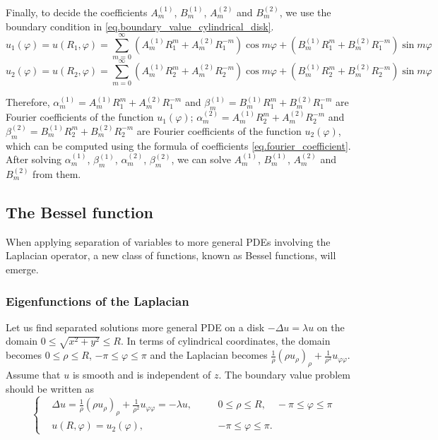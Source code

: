 Finally, to decide the coefficients $A^{(1)}_m$, $B^{(1)}_m$, $A^{(2)}_m$ and $B^{(2)}_m$, we use the boundary condition in \eqref{eq.boundary_value_cylindrical_disk}.
$$
u_1(\varphi) = u(R_1, \varphi)=\sum_{m = 0}^\infty\left(A^{(1)}_mR_1^m + A^{(2)}_mR_1^{-m}\right)\cos m \varphi + \left(B^{(1)}_mR_1^m + B^{(2)}_mR_1^{-m}\right)\sin m \varphi
$$
$$
u_2(\varphi) = u(R_2, \varphi)=\sum_{m = 0}^\infty\left(A^{(1)}_mR_2^m + A^{(2)}_mR_2^{-m}\right)\cos m \varphi + \left(B^{(1)}_mR_2^m + B^{(2)}_mR_2^{-m}\right)\sin m \varphi
$$

Therefore, $\alpha^{(1)}_m = A^{(1)}_mR_1^m + A^{(2)}_mR_1^{-m}$ and $\beta^{(1)}_m = B^{(1)}_mR_1^m + B^{(2)}_mR_1^{-m}$ are Fourier coefficients of the function $u_1(\varphi)$; $\alpha^{(2)}_m = A^{(1)}_mR_2^m + A^{(2)}_mR_2^{-m}$ and $\beta^{(2)}_m = B^{(1)}_mR_2^m + B^{(2)}_mR_2^{-m}$ are Fourier coefficients of the function $u_2(\varphi)$, which can be computed using the formula of coefficients \eqref{eq.fourier_coefficient}. After solving $\alpha^{(1)}_m$, $\beta^{(1)}_m$, $\alpha^{(2)}_m$, $\beta^{(2)}_m$, we can solve $A^{(1)}_m$, $B^{(1)}_m$, $A^{(2)}_m$ and $B^{(2)}_m$ from them.

\subsection{The Bessel function}

When applying separation of variables to more general PDEs involving the Laplacian operator, a new class of functions, known as Bessel functions, will emerge.

\subsubsection{Eigenfunctions of the Laplacian}
Let us find separated solutions more general PDE on a disk $-\Delta u = \lambda u$ on the domain $0 \leq \sqrt{x^2+y^2} \leq R$. In terms of cylindrical coordinates, the domain becomes $0\le \rho \le R$, $-\pi \leq \varphi \leq \pi$ and the Laplacian becomes $\frac{1}{\rho} ( \rho u_\rho)_\rho + \frac{1}{\rho^2} u_{\varphi\varphi}$. Assume that $u$ is smooth and is independent of $z$. The boundary value problem should be written as
\begin{equation}\label{eq.boundary_value_cylindrical_helmholtz_disk}
\left\{\begin{aligned}
    &\Delta u = \frac{1}{\rho} ( \rho u_\rho)_\rho + \frac{1}{\rho^2} u_{\varphi\varphi} = -\lambda u, \quad && 0\leq \rho \leq R, \quad -\pi \leq \varphi \leq \pi
    \\
    &u(R, \varphi)=u_2(\varphi), && -\pi \leq \varphi \leq \pi. 
\end{aligned}\right.
\end{equation}

